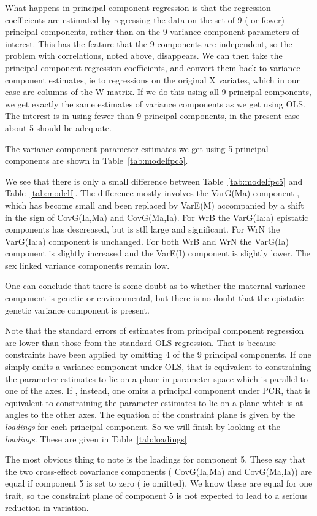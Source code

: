 \documentclass[titlepage]{article}  %
\begin{document}
What happens in principal component regression is that the regression coefficients are estimated by regressing the data on the set of 9 ( or fewer) principal components, rather than on the 9 variance component parameters of interest. This has the feature that the 9 components are independent, so the problem with correlations, noted above, disappears. We can then take the principal component regression coefficients, and convert them back to variance component estimates, ie to regressions on the original X variates, which in our case are columns of the W matrix. If we do this using all 9 principal components, we get exactly the same estimates of variance components as we get using OLS. The interest is in using fewer than 9 principal components, in the present case about 5 should be adequate.

The variance component parameter estimates we get using 5 principal components are shown in Table~\ref{tab:modelfpc5}.

We see that there is only a small difference between Table~\ref{tab:modelfpc5} and Table~\ref{tab:modelf}. The difference mostly involves the VarG(Ma) component , which has become small and been replaced by VarE(M) accompanied by a shift in the sign of CovG(Ia,Ma) and CovG(Ma,Ia). For WrB the VarG(Ia:a) epistatic components has descreased, but is stll large and significant. For WrN the VarG(Ia:a) component is unchanged. For both WrB and WrN the VarG(Ia) component is slightly increased and the VarE(I) component is slightly lower. The sex linked variance components remain low.

One can conclude that there is some doubt as to whether the maternal variance component is genetic or environmental, but there is no doubt that the epistatic genetic variance component is present.

Note that the standard errors of estimates from principal component regression are lower than those from the standard OLS regression. That is because constraints have been applied by omitting 4 of the 9 principal components. If one simply omits a variance component under OLS, that is equivalent to constraining the parameter estimates to lie on a plane in parameter space which is parallel to one of the axes. If , instead, one omits a principal component under PCR, that is equivalent to constraining the parameter estimates to lie on a plane which is at angles to the other axes. The equation of the constraint plane is given by the {\em loadings} for each principal component. So we will finish by looking at the {\em loadings}. These are given in Table~\ref{tab:loadings}

The most obvious thing to note is the loadings for component 5.  These say that the two cross-effect covariance components ( CovG(Ia,Ma) and CovG(Ma,Ia)) are equal if component 5 is set to zero ( ie omitted). We know these are equal for one trait, so the constraint plane of component 5 is not expected to lead to a serious reduction in variation. 
\end{document}
